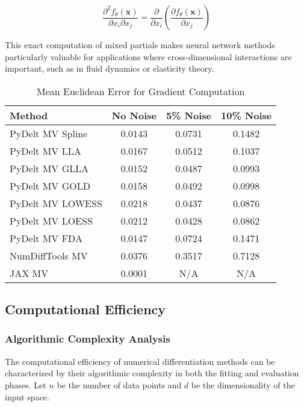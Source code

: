 \documentclass[10pt,journal,compsoc]{IEEEtran}
\begin{document}
\begin{equation}
    \frac{\partial^2 f_{\theta}(\mathbf{x})}{\partial x_i \partial x_j} = \frac{\partial}{\partial x_i}\left(\frac{\partial f_{\theta}(\mathbf{x})}{\partial x_j}\right)
\end{equation}

This exact computation of mixed partials makes neural network methods particularly valuable for applications where cross-dimensional interactions are important, such as in fluid dynamics or elasticity theory.

\begin{table}[!t]
\caption{Mean Euclidean Error for Gradient Computation}
\label{tab:gradient}
\centering
\begin{tabular}{lccc}
\toprule
\textbf{Method} & \textbf{No Noise} & \textbf{5\% Noise} & \textbf{10\% Noise} \\
\midrule
PyDelt MV Spline & 0.0143 & 0.0731 & 0.1482 \\
PyDelt MV LLA & 0.0167 & 0.0512 & 0.1037 \\
PyDelt MV GLLA & 0.0152 & 0.0487 & 0.0993 \\
PyDelt MV GOLD & 0.0158 & 0.0492 & 0.0998 \\
PyDelt MV LOWESS & 0.0218 & 0.0437 & 0.0876 \\
PyDelt MV LOESS & 0.0212 & 0.0428 & 0.0862 \\
PyDelt MV FDA & 0.0147 & 0.0724 & 0.1471 \\
NumDiffTools MV & 0.0376 & 0.3517 & 0.7128 \\
JAX MV & 0.0001 & N/A & N/A \\
\bottomrule
\end{tabular}
\end{table}

\subsection{Computational Efficiency}

\subsubsection{Algorithmic Complexity Analysis}

The computational efficiency of numerical differentiation methods can be characterized by their algorithmic complexity in both the fitting and evaluation phases. Let $n$ be the number of data points and $d$ be the dimensionality of the input space.
\end{document}
